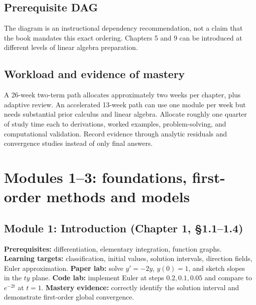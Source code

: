 \documentclass[11pt,letterpaper,oneside]{report}
\theoremstyle{definition}\newtheorem{definition}[theorem]{Definition}
\theoremstyle{remark}\newtheorem{remark}[theorem]{Remark}
\begin{document}
\section{Prerequisite DAG}
\begin{center}
\end{center}
\begin{caution}The diagram is an instructional dependency recommendation, not a claim that the book mandates this exact ordering. Chapters 5 and 9 can be introduced at different levels of linear algebra preparation.\end{caution}
\section{Workload and evidence of mastery}
A 26-week two-term path allocates approximately two weeks per chapter, plus adaptive review. An accelerated 13-week path can use one module per week but needs substantial prior calculus and linear algebra. Allocate roughly one quarter of study time each to derivations, worked examples, problem-solving, and computational validation. Record evidence through analytic residuals and convergence studies instead of only final answers.
\chapter{Modules 1--3: foundations, first-order methods and models}
\section{Module 1: Introduction (Chapter 1, \S1.1--1.4)}
\textbf{Prerequisites:} differentiation, elementary integration, function graphs. \textbf{Learning targets:} classification, initial values, solution intervals, direction fields, Euler approximation. \textbf{Paper lab:} solve $y'=-2y$, $y(0)=1$, and sketch slopes in the $ty$ plane. \textbf{Code lab:} implement Euler at steps $0.2,0.1,0.05$ and compare to $e^{-2t}$ at $t=1$. \textbf{Mastery evidence:} correctly identify the solution interval and demonstrate first-order global convergence.
\end{document}
